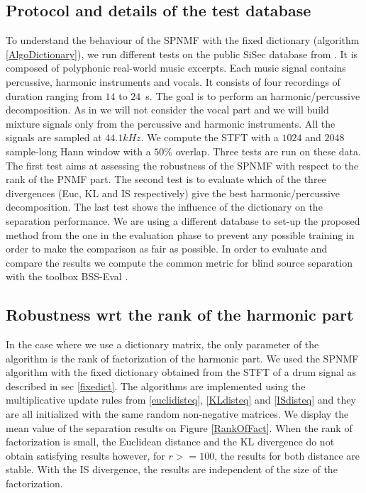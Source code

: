 \documentclass[journal]{IEEEtran}
\begin{document}
\subsection{Protocol and details of the test database}


To understand the behaviour of the SPNMF with the fixed dictionary (algorithm \ref{AlgoDictionary}), we run different tests on the public SiSec database from \cite{SiSec10}. It is composed of polyphonic real-world music excerpts. Each music signal contains percussive, harmonic instruments and vocals. It consists of four recordings of duration ranging from $14$ to $24$~s. The goal is to perform an harmonic/percussive decomposition. As in \cite{canadas2014percussive} we will not consider the vocal part and we will build mixture signals only from the percussive and harmonic instruments. All the signals are sampled at $44.1kHz$. We compute the STFT with a $1024$ and $2048$ sample-long Hann window with a $50\%$ overlap.
Three tests are run on these data. The first test aims at assessing the robustness of the SPNMF with respect to the rank of the PNMF part. The second test is to evaluate which of the three divergences (Euc, KL and IS respectively) give the best harmonic/percussive decomposition. The last test shows the influence of the dictionary on the separation performance. We are using a different database to set-up the proposed method from the one in the evaluation phase to prevent any possible training in order to make the comparison as fair as possible. 
In order to evaluate and compare the results we compute the common metric for blind source separation with the toolbox BSS-Eval \cite{bsseval}. 


\subsection{Robustness wrt the rank of the harmonic part}\label{setup:rank}

In the case where we use a dictionary matrix, the only parameter of the algorithm is the rank of factorization of the harmonic part. We used the SPNMF algorithm with the fixed dictionary obtained from the STFT of a drum signal as described in sec \ref{fixedict}. The algorithms are implemented using the multiplicative update rules from \ref{euclidisteq}, \ref{KLdisteq} and \ref{ISdisteq} and they are all initialized with the same random non-negative matrices. 
We display the mean value of the separation results on Figure \ref{RankOfFact}. When the rank of factorization is small, the Euclidean distance and the KL divergence do not obtain satisfying results however, for $r>=100$, the results for both distance are stable. With the IS divergence, the results are independent of the size of the factorization.
\end{document}

